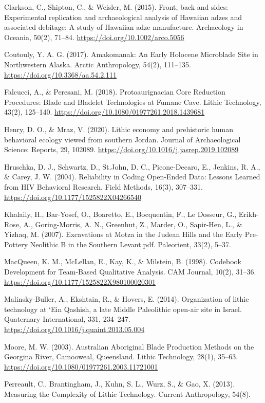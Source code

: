 \documentclass[
]{article}
\begin{document}
Clarkson, C., Shipton, C., \& Weisler, M. (2015). Front, back and sides:
Experimental replication and archaeological analysis of Hawaiian adzes
and associated debitage: A study of Hawaiian adze manufacture.
Archaeology in Oceania, 50(2), 71--84.
\url{https://doi.org/10.1002/arco.5056}

Coutouly, Y. A. G. (2017). Amakomanak: An Early Holocene Microblade Site
in Northwestern Alaska. Arctic Anthropology, 54(2), 111--135.
\url{https://doi.org/10.3368/aa.54.2.111}

Falcucci, A., \& Peresani, M. (2018). Protoaurignacian Core Reduction
Procedures: Blade and Bladelet Technologies at Fumane Cave. Lithic
Technology, 43(2), 125--140.
\url{https://doi.org/10.1080/01977261.2018.1439681}

Henry, D. O., \& Mraz, V. (2020). Lithic economy and prehistoric human
behavioral ecology viewed from southern Jordan. Journal of
Archaeological Science: Reports, 29, 102089.
\url{https://doi.org/10.1016/j.jasrep.2019.102089}

Hruschka, D. J., Schwartz, D., St.John, D. C., Picone-Decaro, E.,
Jenkins, R. A., \& Carey, J. W. (2004). Reliability in Coding Open-Ended
Data: Lessons Learned from HIV Behavioral Research. Field Methods,
16(3), 307--331. \url{https://doi.org/10.1177/1525822X04266540}

Khalaily, H., Bar-Yosef, O., Boaretto, E., Bocquentin, F., Le Dosseur,
G., Erikh-Rose, A., Goring-Morris, A. N., Greenhut, Z., Marder, O.,
Sapir-Hen, L., \& Yizhaq, M. (2007). Excavations at Motza in the Judean
Hills and the Early Pre-Pottery Neolithic B in the Southern Levant.pdf.
Paleorient, 33(2), 5--37.

MacQueen, K. M., McLellan, E., Kay, K., \& Milstein, B. (1998). Codebook
Development for Team-Based Qualitative Analysis. CAM Journal, 10(2),
31--36. \url{https://doi.org/10.1177/1525822X980100020301}

Malinsky-Buller, A., Ekshtain, R., \& Hovers, E. (2014). Organization of
lithic technology at `Ein Qashish, a late Middle Paleolithic open-air
site in Israel. Quaternary International, 331, 234--247.
\url{https://doi.org/10.1016/j.quaint.2013.05.004}

Moore, M. W. (2003). Australian Aboriginal Blade Production Methods on
the Georgina River, Camooweal, Queensland. Lithic Technology, 28(1),
35--63. \url{https://doi.org/10.1080/01977261.2003.11721001}

Perreault, C., Brantingham, J., Kuhn, S. L., Wurz, S., \& Gao, X.
(2013). Measuring the Complexity of Lithic Technology. Current
Anthropology, 54(8).
\end{document}
